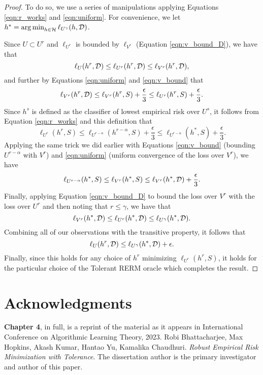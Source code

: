 \begin{proof}
To do so, we use a series of manipulations applying Equations \ref{eqn:r_works} and \ref{eqn:uniform}. For convenience, we let $h^* = \operatorname*{arg\,min}_{h \in \mathcal H} \ell_{U^\gamma}(h, \mathcal D)$. 

Since $U \subset U^r$ and $\ell_{U^r}$ is bounded by $\ell_{V^r}$ (Equation \ref{eqn:v_bound_D}), we have that $$\ell_U(h^r, \mathcal D) \leq \ell_{U^r}(h^r, \mathcal D) \leq \ell_{V^r}(h^r, \mathcal D),$$ 
and further by Equations \ref{eqn:uniform} and \ref{eqn:v_bound} that
$$\ell_{V^r}(h^r, \mathcal D) \leq \ell_{V^r}(h^r, S) + \frac{\epsilon}{3} \leq \ell_{U^r}(h^r, S) + \frac{\epsilon}{3}.$$
Since $h^s$ is defined as the classifier of lowest empirical risk over $U^s$, it follows from Equation \ref{eqn:r_works} and this definition that 
$$\ell_{U^r}(h^r, S) \leq \ell_{U^{r-\alpha}}(h^{r-\alpha}, S) + \frac{\epsilon}{3} \leq \ell_{U^{r-\alpha}}(h^*, S) + \frac{\epsilon}{3}.$$
Applying the same trick we did earlier with Equations \ref{eqn:v_bound} (bounding $U^{r-\alpha}$ with $V^r$) and \ref{eqn:uniform} (uniform convergence of the loss over $V^r$), we have $$\ell_{U^{r-\alpha}}(h^*, S) \leq \ell_{V^r}(h^*, S) \leq \ell_{V^r}(h^*, \mathcal D) + \frac{\epsilon}{3}.$$ Finally, applying Equation \ref{eqn:v_bound_D} to bound the loss over $V^r$ with the loss over $U^r$ and then noting that $r \leq \gamma$, we have that $$\ell_{V^r}(h^*, \mathcal D) \leq \ell_{U^r}(h^*, \mathcal D) \leq \ell_{U^\gamma}(h^*, \mathcal D).$$ Combining all of our observations with the transitive property, it follows that $$\ell_U(h^r, \mathcal D) \leq \ell_{U^\gamma}(h^*, \mathcal D) + \epsilon.$$ Finally, since this holds for any choice of $h^r$ minimizing $\ell_{U^r}(h^r,S)$, it holds for the particular choice of the Tolerant RERM oracle which completes the result.
\end{proof}

\section*{Acknowledgments}

\textbf{Chapter 4}, in full, is a reprint of the material as it appears in International Conference on Algorithmic Learning Theory, 2023. Robi Bhattacharjee, Max Hopkins, Akash Kumar, Hantao Yu, Kamalika Chaudhuri. \emph{Robust Empirical Risk Minimization with Tolerance}. The dissertation author is the primary investigator and author of this paper. 





%
%
%
%
%
%
%